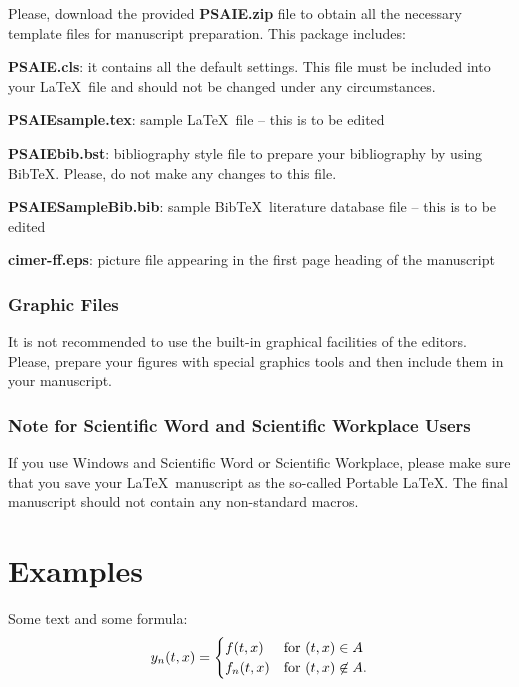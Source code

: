 \documentclass{PSAIE}%
\begin{document}
\noindent Please, download the provided \textbf{PSAIE.zip} file to
obtain all the necessary template files for manuscript
preparation. This package includes:
\begin{list}{--}{\setlength{\itemsep}{2pt}\setlength{\parsep}{0pt}\setlength{\leftmargin}{15mm}}
\item \textbf{PSAIE.cls}: it contains all the default settings.
This file must be included into your \LaTeX\ file and should not
be changed under any circumstances. \item
\textbf{PSAIEsample.tex}: sample \LaTeX\ file -- this is to be
edited \item \textbf{PSAIEbib.bst}: bibliography style file to
prepare your bibliography by using Bib\TeX. Please, do not make
any changes to this file. \item \textbf{PSAIESampleBib.bib}:
sample Bib\TeX\ literature database file -- this is to be edited
\item \textbf{cimer-ff.eps}: picture file appearing in the first
page heading of the manuscript
\end{list}

\subsubsection{Graphic Files}

\noindent It is not recommended to use the built-in graphical
facilities of the editors. Please, prepare your figures with
special graphics tools and then include them in your manuscript.

\subsubsection{Note for Scientific Word and Scientific Workplace Users}

\noindent If you use Windows and Scientific Word or Scientific Workplace, please
make sure that you save your \LaTeX\ manuscript as the so-called
Portable \LaTeX. The final manuscript should not contain any
non-standard macros.


\section{Examples}

\noindent Some text and some formula:
\begin{equation}
y_n(t,x)=
\begin{cases}
 f(t,x) & \text{for } (t,x) \in A \cr
f_n(t,x) & \text{for } (t,x) \not\in A.
\end{cases}
\end{equation}
\end{document}
